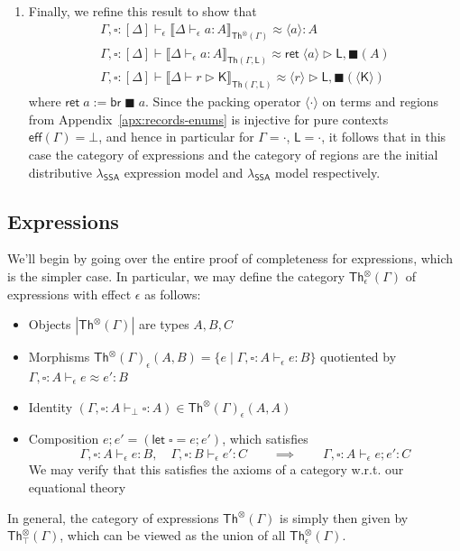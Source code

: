 \documentclass[acmsmall,screen,review]{acmart}
\newcommand{\ms}[1]{\ensuremath{\mathsf{#1}}}
\newcommand{\brb}[2]{\ms{br}\;#1\;#2}
\newcommand{\bhyp}[2]{#1 : #2}
\newcommand{\hasty}[4]{#1 \vdash_{#2} #3: {#4}}
\newcommand{\haslb}[3]{#1 \vdash #2 \rhd #3}
\newcommand{\teqv}{\approx}
\newcommand{\tmeq}[5]{#1 \vdash_{#2} #3 \teqv #4 : {#5}}
\newcommand{\lbeq}[4]{#1 \vdash #2 \teqv #3 \rhd {#4}}
\newcommand{\dnt}[1]{\llbracket{#1}\rrbracket}
\newcommand{\invar}{\square}
\newcommand{\outlb}{\blacksquare}
\newcommand{\pckd}[1]{\langle #1 \rangle}
\newcommand{\isotopessa}{\(\lambda_{\ms{SSA}}\)}
\begin{document}
\begin{enumerate}
  \item Finally, we refine this result to show that
  \begin{equation}
    \begin{gathered}
    \tmeq{\Gamma, \invar : [\Delta]}{\epsilon}
      {\dnt{\hasty{\Delta}{\epsilon}{a}{A}}_{\ms{Th}^\otimes(\Gamma)}}{\pckd{a}}{A}
    \\
    \lbeq{\Gamma, \invar : [\Delta]}
      {\dnt{\hasty{\Delta}{\epsilon}{a}{A}}_{\ms{Th}(\Gamma, \ms{L})}}{\ms{ret}\;\pckd{a}}
      {\ms{L}, \outlb(A)}
    \\
    \lbeq{\Gamma, \invar : [\Delta]}
      {\dnt{\haslb{\Delta}{r}{\ms{K}}}_{\ms{Th}(\Gamma, \ms{L})}}
      {\pckd{r}}{\ms{L}, \outlb(\pckd{\ms{K}})}
    \end{gathered}
  \end{equation}
  where $\ms{ret}\;a := \brb{\outlb}{a}$. Since the packing operator $\pckd{\cdot}$ on terms and
  regions from Appendix~\ref{apx:records-enums} is injective for pure contexts $\ms{eff}(\Gamma) =
  \bot$, and hence in particular for $\Gamma = \cdot$, $\ms{L} = \cdot$, it follows that in this
  case the category of expressions and the category of regions are the initial distributive
  \isotopessa{} expression model and \isotopessa{} model respectively.
\end{enumerate}

\subsection{Expressions}

We'll begin by going over the entire proof of completeness for expressions, which is the simpler
case. In particular, we may define the category $\ms{Th}_\epsilon^\otimes(\Gamma)$ of expressions
with effect $\epsilon$ as follows:
\begin{itemize}
  \item Objects $|\ms{Th}^\otimes(\Gamma)|$ are types $A, B, C$
  \item Morphisms $\ms{Th}^\otimes(\Gamma)_\epsilon(A, B) = \{e \mid \hasty{\Gamma,
    \bhyp{\invar}{A}}{\epsilon}{e}{B}\}$ quotiented by $\tmeq{\Gamma,
    \bhyp{\invar}{A}}{\epsilon}{e}{e'}{B}$
  \item Identity $(\hasty{\Gamma, \bhyp{\invar}{A}}{\bot}{\invar}{A}) \in
  \ms{Th}^\otimes(\Gamma)_\epsilon(A, A)$
  \item Composition $e;e' = (\ms{let}\;\invar = e; e')$, which satisfies
  $$
  \hasty{\Gamma, \bhyp{\invar}{A}}{\epsilon}{e}{B}, \quad
  \hasty{\Gamma, \bhyp{\invar}{B}}{\epsilon}{e'}{C} \qquad \implies \qquad
  \hasty{\Gamma, \bhyp{\invar}{A}}{\epsilon}{e;e'}{C}
  $$
  We may verify that this satisfies the axioms of a category w.r.t. our equational theory
\end{itemize}
In general, the category of expressions $\ms{Th}^\otimes(\Gamma)$ is simply then given by
$\ms{Th}_\top^\otimes(\Gamma)$, which can be viewed as the union of all
$\ms{Th}_\epsilon^\otimes(\Gamma)$.
\end{document}
